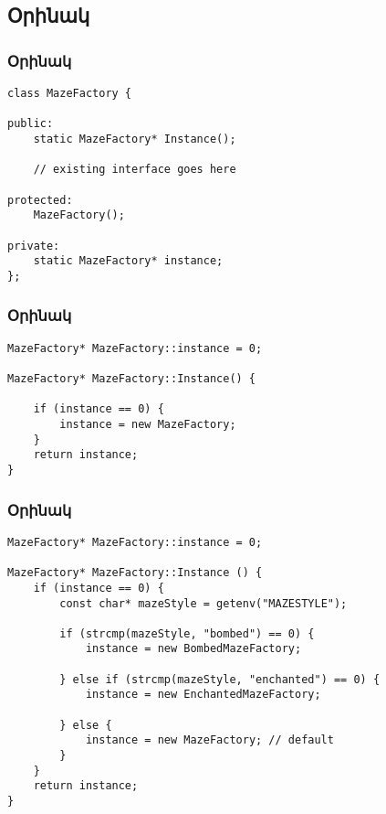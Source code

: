 \documentclass{beamer}
\begin{document}
\subsection{Օրինակ}
\begin{frame}[fragile]\frametitle{Օրինակ}
\begin{english}
\begin{verbatim}
class MazeFactory {

public:
    static MazeFactory* Instance();

    // existing interface goes here

protected:
    MazeFactory();

private:
    static MazeFactory* instance;
};
\end{verbatim}
\end{english}
\end{frame}

\begin{frame}[fragile]\frametitle{Օրինակ}
\begin{english}
\begin{verbatim}
MazeFactory* MazeFactory::instance = 0;

MazeFactory* MazeFactory::Instance() {

    if (instance == 0) {
        instance = new MazeFactory;
    }
    return instance;
}
\end{verbatim}
\end{english}
\end{frame}

\begin{frame}[fragile]\frametitle{Օրինակ}
\begin{english}
\begin{verbatim}
MazeFactory* MazeFactory::instance = 0;

MazeFactory* MazeFactory::Instance () {
    if (instance == 0) {
        const char* mazeStyle = getenv("MAZESTYLE");

        if (strcmp(mazeStyle, "bombed") == 0) {
            instance = new BombedMazeFactory;

        } else if (strcmp(mazeStyle, "enchanted") == 0) {
            instance = new EnchantedMazeFactory;

        } else {
            instance = new MazeFactory; // default
        }
    }
    return instance;
}
\end{verbatim}
\end{english}
\end{frame}
\end{document}
